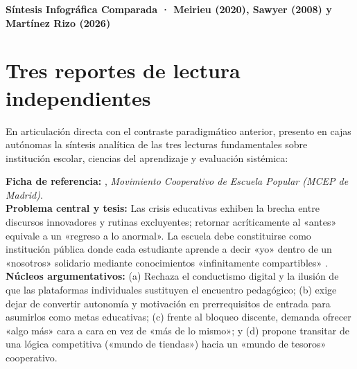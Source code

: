 \documentclass[spanish,letterpaper,oneside]{article}
\begin{document}
\clearpage
\begin{landscape}
\thispagestyle{empty}
\begin{center}
\vspace*{-0.55cm}
\textbf{\color{iiiepeNavy}\large Síntesis Infográfica Comparada · Meirieu (2020), Sawyer (2008) y Martínez Rizo (2026)}\\[4pt]
\resizebox{0.99\linewidth}{!}{}
\end{center}
\end{landscape}
\clearpage
\section{Tres reportes de lectura independientes}
En articulación directa con el contraste paradigmático anterior, presento en cajas autónomas la síntesis analítica de las tres lecturas fundamentales sobre institución escolar, ciencias del aprendizaje y evaluación sistémica:

\begin{tcolorbox}[colback=iiiepePale,colframe=iiiepeNavy,title=\textbf{Reporte de lectura 1 · Philippe Meirieu (2020): «La escuela después»... ¿con la pedagogía de antes?},breakable]
\textbf{Ficha de referencia:} \citet{meirieu2020escuela}, \textit{Movimiento Cooperativo de Escuela Popular (MCEP de Madrid)}.\\
\textbf{Problema central y tesis:} Las crisis educativas exhiben la brecha entre discursos innovadores y rutinas excluyentes; retornar acríticamente al «antes» equivale a un «regreso a lo anormal». La escuela debe constituirse como institución pública donde cada estudiante aprende a decir «yo» dentro de un «nosotros» solidario mediante conocimientos «infinitamente compartibles» \citep{meirieu2020escuela}.\\[4pt]
\textbf{Núcleos argumentativos:} (a) Rechaza el conductismo digital y la ilusión de que las plataformas individuales sustituyen el encuentro pedagógico; (b) exige dejar de convertir autonomía y motivación en prerrequisitos de entrada para asumirlos como metas educativas; (c) frente al bloqueo discente, demanda ofrecer «algo más» cara a cara en vez de «más de lo mismo»; y (d) propone transitar de una lógica competitiva («mundo de tiendas») hacia un «mundo de tesoros» cooperativo.
\end{tcolorbox}
\end{document}
